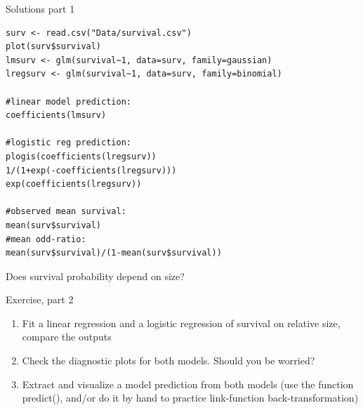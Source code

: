 \documentclass[10pt]{beamer}
\makeatletter
\newenvironment{kframe}{%
 \def\at@end@of@kframe{}%
 \ifinner\ifhmode%
  \def\at@end@of@kframe{\end{minipage}}%
  \begin{minipage}{\columnwidth}%
 \fi\fi%
 \def\FrameCommand##1{\hskip\@totalleftmargin \hskip-\fboxsep
 \colorbox{shadecolor}{##1}\hskip-\fboxsep
     \hskip-\linewidth \hskip-\@totalleftmargin \hskip\columnwidth}%
 \MakeFramed {\advance\hsize-\width
   \@totalleftmargin\z@ \linewidth\hsize
   \@setminipage}}%
 {\par\unskip\endMakeFramed%
 \at@end@of@kframe}
\newenvironment{knitrout}{}{} %
\makeatother
\begin{document}
\begin{frame}[fragile]{Solutions part 1}
     
\begin{knitrout}
\color{fgcolor}\begin{kframe}
\small
\begin{verbatim}
surv <- read.csv("Data/survival.csv")
plot(surv$survival)
lmsurv <- glm(survival~1, data=surv, family=gaussian)
lregsurv <- glm(survival~1, data=surv, family=binomial)

#linear model prediction:
coefficients(lmsurv)

#logistic reg prediction:
plogis(coefficients(lregsurv))
1/(1+exp(-coefficients(lregsurv)))
exp(coefficients(lregsurv))

#observed mean survival:
mean(surv$survival)
#mean odd-ratio:
mean(surv$survival)/(1-mean(surv$survival))
\end{verbatim}
\end{kframe}
\end{knitrout}
\end{frame}


\begin{frame}{Does survival probability depend on size?}
 
  \begin{exampleblock}{Exercise, part 2}
    \begin{enumerate}
      \item Fit a linear regression and a logistic regression of survival on relative size, compare the outputs
      \item Check the diagnostic plots for both models. Should you be worried?
      \item Extract and visualize a model prediction from both models (use the function predict(), and/or do it by hand to practice link-function back-transformation)
    \end{enumerate}
  \end{exampleblock}
  
\end{frame}
\end{document}
